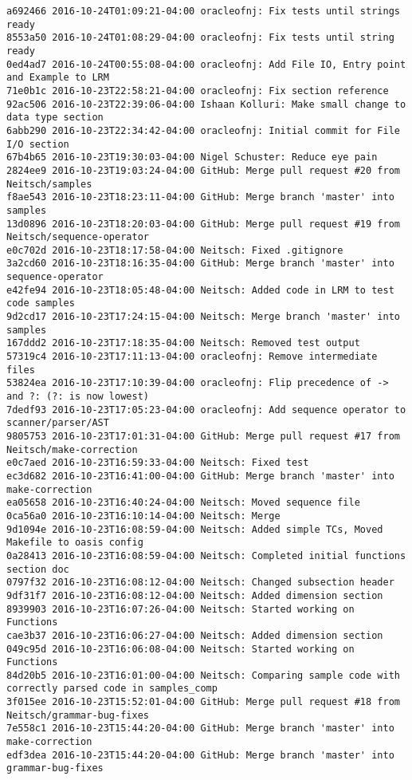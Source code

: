 \begin{lstlisting}
a692466 2016-10-24T01:09:21-04:00 oracleofnj: Fix tests until strings ready
8553a50 2016-10-24T01:08:29-04:00 oracleofnj: Fix tests until string ready
0ed4ad7 2016-10-24T00:55:08-04:00 oracleofnj: Add File IO, Entry point and Example to LRM
71e0b1c 2016-10-23T22:58:21-04:00 oracleofnj: Fix section reference
92ac506 2016-10-23T22:39:06-04:00 Ishaan Kolluri: Make small change to data type section
6abb290 2016-10-23T22:34:42-04:00 oracleofnj: Initial commit for File I/O section
67b4b65 2016-10-23T19:30:03-04:00 Nigel Schuster: Reduce eye pain
2824ee9 2016-10-23T19:03:24-04:00 GitHub: Merge pull request #20 from Neitsch/samples
f8ae543 2016-10-23T18:23:11-04:00 GitHub: Merge branch 'master' into samples
13d0896 2016-10-23T18:20:03-04:00 GitHub: Merge pull request #19 from Neitsch/sequence-operator
e0c702d 2016-10-23T18:17:58-04:00 Neitsch: Fixed .gitignore
3a2cd60 2016-10-23T18:16:35-04:00 GitHub: Merge branch 'master' into sequence-operator
e42fe94 2016-10-23T18:05:48-04:00 Neitsch: Added code in LRM to test code samples
9d2cd17 2016-10-23T17:24:15-04:00 Neitsch: Merge branch 'master' into samples
167ddd2 2016-10-23T17:18:35-04:00 Neitsch: Removed test output
57319c4 2016-10-23T17:11:13-04:00 oracleofnj: Remove intermediate files
53824ea 2016-10-23T17:10:39-04:00 oracleofnj: Flip precedence of -> and ?: (?: is now lowest)
7dedf93 2016-10-23T17:05:23-04:00 oracleofnj: Add sequence operator to scanner/parser/AST
9805753 2016-10-23T17:01:31-04:00 GitHub: Merge pull request #17 from Neitsch/make-correction
e0c7aed 2016-10-23T16:59:33-04:00 Neitsch: Fixed test
ec3d682 2016-10-23T16:41:00-04:00 GitHub: Merge branch 'master' into make-correction
ea05658 2016-10-23T16:40:24-04:00 Neitsch: Moved sequence file
0ca56a0 2016-10-23T16:10:14-04:00 Neitsch: Merge
9d1094e 2016-10-23T16:08:59-04:00 Neitsch: Added simple TCs, Moved Makefile to oasis config
0a28413 2016-10-23T16:08:59-04:00 Neitsch: Completed initial functions section doc
0797f32 2016-10-23T16:08:12-04:00 Neitsch: Changed subsection header
9df31f7 2016-10-23T16:08:12-04:00 Neitsch: Added dimension section
8939903 2016-10-23T16:07:26-04:00 Neitsch: Started working on Functions
cae3b37 2016-10-23T16:06:27-04:00 Neitsch: Added dimension section
049c95d 2016-10-23T16:06:08-04:00 Neitsch: Started working on Functions
84d20b5 2016-10-23T16:01:00-04:00 Neitsch: Comparing sample code with correctly parsed code in samples_comp
3f015ee 2016-10-23T15:52:01-04:00 GitHub: Merge pull request #18 from Neitsch/grammar-bug-fixes
7e558c1 2016-10-23T15:44:20-04:00 GitHub: Merge branch 'master' into make-correction
edf3dea 2016-10-23T15:44:20-04:00 GitHub: Merge branch 'master' into grammar-bug-fixes

\end{lstlisting}
